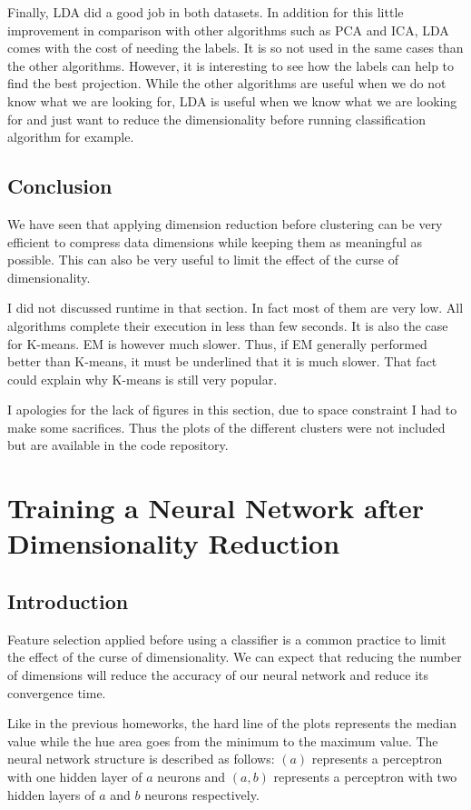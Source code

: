 \documentclass[twocolumn, 10pt]{article}
\begin{document}
			Finally, LDA did a good job in both datasets. In addition for this little improvement in comparison with other algorithms such as PCA and ICA, LDA comes with the cost of needing the labels. It is so not used in the same cases than the other algorithms. However, it is interesting to see how the labels can help to find the best projection. While the other algorithms are useful when we do not know what we are looking for, LDA is useful when we know what we are looking for and just want to reduce the dimensionality before running classification algorithm for example.
		\subsection{Conclusion}
			We have seen that applying dimension reduction before clustering can be very efficient to compress data dimensions while keeping them as meaningful as possible. This can also be very useful to limit the effect of the curse of dimensionality.

			I did not discussed runtime in that section. In fact most of them are very low. All algorithms complete their execution in less than few seconds. It is also the case for K-means. EM is however much slower. Thus, if EM generally performed better than K-means, it must be underlined that it is much slower. That fact could explain why K-means is still very popular.

			I apologies for the lack of figures in this section, due to space constraint I had to make some sacrifices. Thus the plots of the different clusters were not included but are available in the code repository.
	\section{Training a Neural Network after Dimensionality Reduction}
		\subsection{Introduction}
			Feature selection applied before using a classifier is a common practice to limit the effect of the curse of dimensionality. We can expect that reducing the number of dimensions will reduce the accuracy of our neural network and reduce its convergence time.

			Like in the previous homeworks, the hard line of the plots represents the median value while the hue area goes from the minimum to the maximum value. The neural network structure is described as follows: $(a)$ represents a perceptron with one hidden layer of $a$ neurons and $(a, b)$ represents a perceptron with two hidden layers of $a$ and $b$ neurons respectively.
\end{document}
